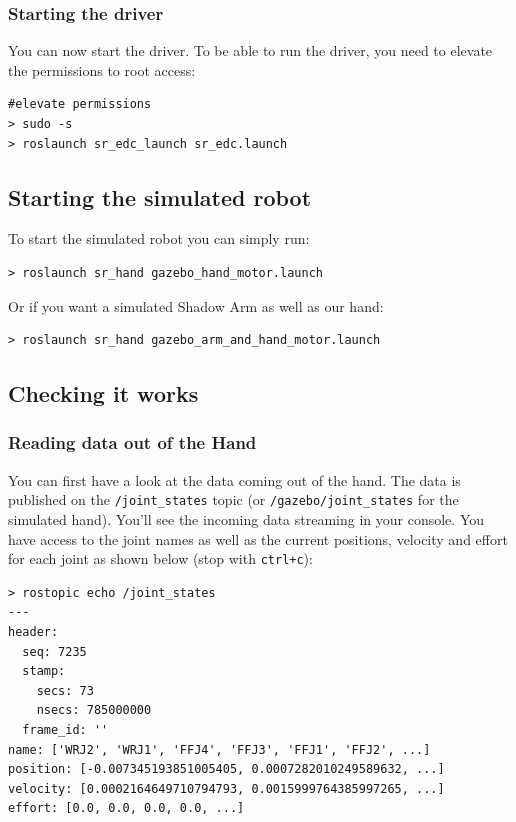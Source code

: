 \documentclass[12pt]{article}
\begin{document}
\subsubsection{Starting the driver}
\par You can now start the driver. To be able to run the driver, you need to elevate the permissions to root access:
  \begin{lstlisting}[escapeinside='']
#elevate permissions
> sudo -s
> roslaunch sr_edc_launch sr_edc.launch
  \end{lstlisting}

\subsection{Starting the simulated robot}
\label{sec:start-simul-hand}
\par To start the simulated robot you can simply run:
  \begin{lstlisting}[escapeinside='']
> roslaunch sr_hand gazebo_hand_motor.launch
  \end{lstlisting}

\par Or if you want a simulated Shadow Arm as well as our hand:
  \begin{lstlisting}[escapeinside='']
> roslaunch sr_hand gazebo_arm_and_hand_motor.launch
  \end{lstlisting}

\subsection{Checking it works}
\label{sec:checking-it-works}

\subsubsection{Reading data out of the Hand}
\par You can first have a look at the data coming out of the hand. The data is published on the \texttt{/joint\_states} topic (or \texttt{/gazebo/joint\_states} for the simulated hand). You'll see the incoming data streaming in your console. You have access to the joint names as well as the current positions, velocity and effort for each joint as shown below (stop with \texttt{ctrl+c}):
  \begin{lstlisting}[escapeinside='']
> rostopic echo /joint_states
---
header:
  seq: 7235
  stamp:
    secs: 73
    nsecs: 785000000
  frame_id: ''
name: ['WRJ2', 'WRJ1', 'FFJ4', 'FFJ3', 'FFJ1', 'FFJ2', ...]
position: [-0.007345193851005405, 0.0007282010249589632, ...]
velocity: [0.0002164649710794793, 0.0015999764385997265, ...]
effort: [0.0, 0.0, 0.0, 0.0, ...]
  \end{lstlisting}
\end{document}
